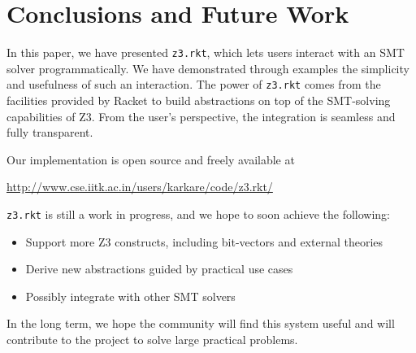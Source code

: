 \section{Conclusions and Future Work}

In this paper, we have presented \texttt{z3.rkt}, which lets users interact
with an SMT solver programmatically. We have demonstrated through examples
the simplicity and usefulness of such an interaction. The power of
\texttt{z3.rkt} comes from the facilities provided by Racket to build
abstractions on top of the SMT-solving capabilities of Z3. From the user's
perspective, the integration is seamless and fully transparent.

Our implementation is open source and freely available at
\begin{center}
\url{http://www.cse.iitk.ac.in/users/karkare/code/z3.rkt/}
\end{center}

\texttt{z3.rkt} is still a work in progress, and we hope to soon achieve the
following:

\begin{itemize}
\item Support more Z3 constructs, including bit-vectors and external theories
\item Derive new abstractions guided by practical use cases
\item Possibly integrate with other SMT solvers
\end{itemize}

In the long term, we hope the community will find this system useful and will
contribute to the project to solve large practical problems.
